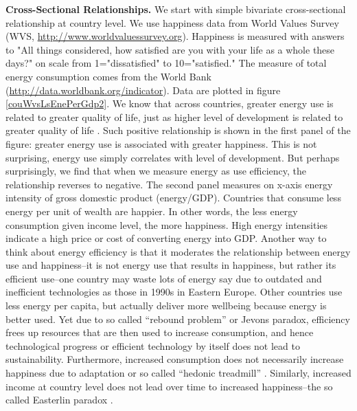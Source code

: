 \documentclass[10pt, letterpaper]{article}
\begin{document}
\begin{spacing}{1.4}
\textbf{Cross-Sectional Relationships.} We start with simple bivariate cross-sectional relationship at country level. %
We use happiness data from World Values Survey
(WVS, \url{http://www.worldvaluessurvey.org}).  Happiness is measured with answers to
"All things considered, how satisfied are you with your life as a whole these
days?" on scale from 1="dissatisfied" to 10="satisfied."
The measure of total energy  consumption comes from the World Bank
(\url{http://data.worldbank.org/indicator}). %
% 
%
Data are plotted in figure \ref{couWvsLsEnePerGdp2}. We know that across
 countries, greater energy use is related to greater quality of life, just as higher level of development is related to greater
 quality of life \cite{mazur11}. Such positive relationship is shown in the first panel of the figure: greater
 energy use is associated with greater happiness. This is not
 surprising, energy use simply correlates with level of development. But perhaps
 surprisingly,  we find that when we measure energy as use efficiency, the relationship reverses to
 negative.  The second panel
 measures on x-axis energy intensity of gross domestic product  (energy/GDP). %
 Countries that  consume less
 energy per unit of wealth are happier. In other words, the less energy
 consumption 
 given income level, the more happiness. High energy intensities indicate a high
 price or cost of converting energy into GDP. Another way to think about energy
 efficiency is that it moderates the relationship  between energy use and happiness--it is not energy use that results in
happiness, but rather its efficient use--one country may waste lots of
energy say due to outdated and inefficient technologies as those in 1990s in
Eastern Europe. Other countries use less energy per
capita, but actually deliver more wellbeing because energy is better used. Yet
due to so called ``rebound problem'' or Jevons paradox, efficiency frees up resources that are then used to increase consumption, and
hence technological progress or efficient technology by itself does not lead to
sustainability. Furthermore, increased consumption does not necessarily
increase happiness due to adaptation or so called ``hedonic treadmill''
\cite{brickman78cj}. Similarly, increased income at country level does not lead
over time to increased happiness--the so called Easterlin paradox
\cite{easterlin74,easterlin10B}. 



\end{spacing}
\end{document}
